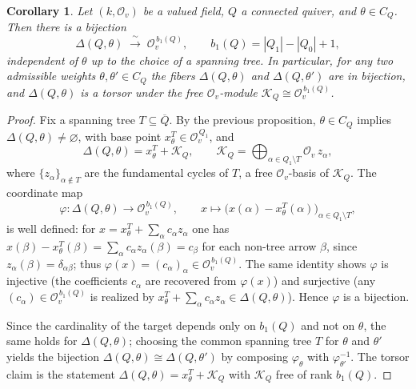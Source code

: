 \documentclass[12pt]{amsart}
\theoremstyle{plain}
\newtheorem{corollary}[theorem]{Corollary}
\theoremstyle{definition}
\begin{document}
\begin{corollary}
Let $(k,\mathcal{O}_v)$ be a valued field, $Q$ a connected quiver, and
$\theta \in C_Q$. Then there is a bijection
\[
  \Delta(Q,\theta)\;\xrightarrow{\ \sim\ }\;\mathcal{O}_v^{\,b_1(Q)},
  \qquad b_1(Q) = |Q_1| - |Q_0| + 1,
\]
independent of $\theta$ up to the choice of a spanning tree. In particular, for
any two admissible weights $\theta,\theta' \in C_Q$ the fibers $\Delta(Q,\theta)$
and $\Delta(Q,\theta')$ are in bijection, and $\Delta(Q,\theta)$ is a torsor under
the free $\mathcal{O}_v$-module $\mathcal{K}_Q \cong \mathcal{O}_v^{\,b_1(Q)}$.
\end{corollary}

\begin{proof}
Fix a spanning tree $T \subseteq \overline{Q}$. By the previous proposition,
$\theta \in C_Q$ implies $\Delta(Q,\theta) \neq \varnothing$, with base point
$x^T_\theta \in \mathcal{O}_v^{\,Q_1}$, and
\[
  \Delta(Q,\theta) = x^T_\theta + \mathcal{K}_Q,
  \qquad
  \mathcal{K}_Q = \bigoplus_{\alpha \in Q_1 \setminus T} \mathcal{O}_v\, z_\alpha,
\]
where $\{z_\alpha\}_{\alpha \notin T}$ are the fundamental cycles of $T$, a free
$\mathcal{O}_v$-basis of $\mathcal{K}_Q$. The coordinate map
\[
  \varphi \colon \Delta(Q,\theta) \longrightarrow \mathcal{O}_v^{\,b_1(Q)},
  \qquad
  x \longmapsto \big(x(\alpha) - x^T_\theta(\alpha)\big)_{\alpha \in Q_1\setminus T},
\]
is well defined: for $x = x^T_\theta + \sum_\alpha c_\alpha z_\alpha$ one has
$x(\beta) - x^T_\theta(\beta) = \sum_\alpha c_\alpha z_\alpha(\beta) = c_\beta$
for each non-tree arrow $\beta$, since $z_\alpha(\beta) = \delta_{\alpha\beta}$;
thus $\varphi(x) = (c_\alpha)_\alpha \in \mathcal{O}_v^{\,b_1(Q)}$. The same
identity shows $\varphi$ is injective (the coefficients $c_\alpha$ are recovered
from $\varphi(x)$) and surjective (any $(c_\alpha) \in \mathcal{O}_v^{\,b_1(Q)}$
is realized by $x^T_\theta + \sum_\alpha c_\alpha z_\alpha \in \Delta(Q,\theta)$).
Hence $\varphi$ is a bijection.

Since the cardinality of the target depends only on $b_1(Q)$ and not on $\theta$,
the same holds for $\Delta(Q,\theta)$; choosing the common spanning tree $T$ for
$\theta$ and $\theta'$ yields the bijection
$\Delta(Q,\theta) \cong \Delta(Q,\theta')$ by composing
$\varphi_\theta$ with $\varphi_{\theta'}^{-1}$. The torsor claim is the statement
$\Delta(Q,\theta) = x^T_\theta + \mathcal{K}_Q$ with $\mathcal{K}_Q$ free of rank
$b_1(Q)$.
\end{proof}
\end{document}
